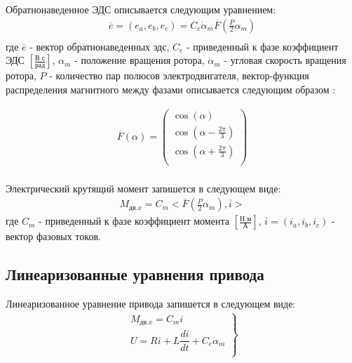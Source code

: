 Обратнонаведенное ЭДС описывается следующим уравнением:
\begin{equation}
\label{eq:p3:9.2}
\begin{alignedat}{2}
\overline{e} = (e_a, e_b, e_c) = C_e \dot{\alpha}_m \overline{F}(\frac{\textit{P}}{2}\alpha_m)\\
\end{alignedat}
\end{equation}
где 
$\overline{e}$ - вектор обратнонаведенных эдс, 
$C_e$ - приведенный к фазе коэффициент ЭДС $[\frac{\textit{В с}}{\textit{рад}} ]$,
$\alpha_m$ - положение вращения ротора, 
$\dot{\alpha}_m$ - угловая скорость вращения ротора, 
$\textit{P}$ - количество пар полюсов электродвигателя, 
вектор-функция распределения магнитного между фазами описывается следующим образом \cite[]{MATLAB1}:

\begin{equation}
\label{eq:p3:9.3}
\begin{alignedat}{2}
\overline{F}(\alpha) = \left( \begin{matrix}
\cos (\alpha) \\
\cos (\alpha - \frac{2 \pi}{3}) \\
\cos (\alpha + \frac{2 \pi}{3}) \\
\end{matrix}
\right) \\
\end{alignedat}
\end{equation}

Электрический крутящий момент запишется в следующем виде:
\begin{equation}
\label{eq:p3:9.4}
\begin{alignedat}{2}
M_{\textit{дв.x}} = C_m <\overline{F}(\frac{\textit{P}}{2}\alpha_m),\overline{i}>
\end{alignedat}
\end{equation}
где
$C_m$ - приведенный к фазе коэффициент момента $[\frac{\textit{Н м}}{\textit{А}} ]$,
$\overline{i} = (i_a, i_b, i_c)$ - вектор фазовых токов.

\subsection{Линеаризованные уравнения привода} \label{sec:ch3/sec9/linearize}

Линеаризованное уравнение привода запишется в следующем виде:
\begin{equation}
\label{eq:p3:lin1}
\begin{alignedat}{2}
\left.
\begin{matrix}
M_{\textit{дв.x}} = C_m i\\
U = R i + L \dfrac{d i}{dt} + C_e \dot{\alpha}_m \\
\end{matrix}
\right\rbrace 
\end{alignedat}
\end{equation}

